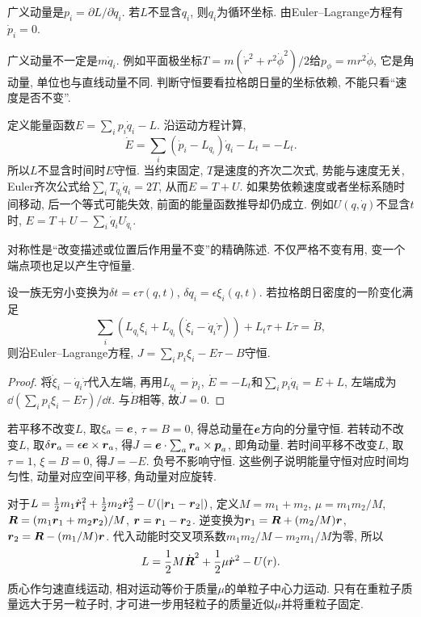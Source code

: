 \begin{definition}
广义动量是$p_i=\partial L/\partial\dot q_i$. 若$L$不显含$q_i$, 则$q_i$为循环坐标. 由Euler--Lagrange方程有$\dot p_i=0$.
\end{definition}
广义动量不一定是$m\dot q_i$. 例如平面极坐标$T=m(\dot r^2+r^2\dot\phi^2)/2$给$p_\phi=mr^2\dot\phi$, 它是角动量, 单位也与直线动量不同. 判断守恒要看拉格朗日量的坐标依赖, 不能只看“速度是否不变”.

定义能量函数$E=\sum_ip_i\dot q_i-L$. 沿运动方程计算,
\[
\dot E=\sum_i(\dot p_i-L_{q_i})\dot q_i-L_t=-L_t.
\]
所以$L$不显含时间时$E$守恒. 当约束固定, $T$是速度的齐次二次式, 势能与速度无关, Euler齐次公式给$\sum_iT_{\dot q_i}\dot q_i=2T$, 从而$E=T+U$. 如果势依赖速度或者坐标系随时间移动, 后一个等式可能失效, 前面的能量函数推导却仍成立. 例如$U(q,\dot q)$不显含$t$时, $E=T+U-\sum_i\dot q_iU_{\dot q_i}$.

对称性是“改变描述或位置后作用量不变”的精确陈述. 不仅严格不变有用, 变一个端点项也足以产生守恒量.
\begin{theorem}
设一族无穷小变换为$\delta t=\epsilon\tau(q,t)$, $\delta q_i=\epsilon\xi_i(q,t)$. 若拉格朗日密度的一阶变化满足
\[
\sum_i(L_{q_i}\xi_i+L_{\dot q_i}(\dot\xi_i-\dot q_i\dot\tau))+L_t\tau+L\dot\tau=\dot B,
\]
则沿Euler--Lagrange方程, $J=\sum_ip_i\xi_i-E\tau-B$守恒.
\end{theorem}
\begin{proof}
将$\dot\xi_i-\dot q_i\dot\tau$代入左端, 再用$L_{q_i}=\dot p_i$, $\dot E=-L_t$和$\sum_ip_i\dot q_i=E+L$, 左端成为
$\dd(\sum_ip_i\xi_i-E\tau)/\dd t$. 与$\dot B$相等, 故$\dot J=0$.
\end{proof}
若平移不改变$L$, 取$\xi_a=\boldsymbol{e}$, $\tau=B=0$, 得总动量在$\boldsymbol{e}$方向的分量守恒. 若转动不改变$L$, 取$\delta\boldsymbol{r}_a=\epsilon\boldsymbol{e}\times\boldsymbol{r}_a$, 得$J=\boldsymbol{e}\cdot\sum_a\boldsymbol{r}_a\times\boldsymbol{p}_a$, 即角动量. 若时间平移不改变$L$, 取$\tau=1$, $\xi=B=0$, 得$J=-E$. 负号不影响守恒. 这些例子说明能量守恒对应时间均匀性, 动量对应空间平移, 角动量对应旋转.

对于$L=\frac12m_1\dot{\boldsymbol{r}}_1^2+\frac12m_2\dot{\boldsymbol{r}}_2^2-U(|\boldsymbol{r}_1-\boldsymbol{r}_2|)$, 定义$M=m_1+m_2$, $\mu=m_1m_2/M$, $\boldsymbol{R}=(m_1\boldsymbol{r}_1+m_2\boldsymbol{r}_2)/M$, $\boldsymbol{r}=\boldsymbol{r}_1-\boldsymbol{r}_2$. 逆变换为$\boldsymbol{r}_1=\boldsymbol{R}+(m_2/M)\boldsymbol{r}$, $\boldsymbol{r}_2=\boldsymbol{R}-(m_1/M)\boldsymbol{r}$. 代入动能时交叉项系数$m_1m_2/M-m_2m_1/M$为零, 所以
\[
L=\frac12M\dot{\boldsymbol{R}}^2+\frac12\mu\dot{\boldsymbol{r}}^2-U(r).
\]
质心作匀速直线运动, 相对运动等价于质量$\mu$的单粒子中心力运动. 只有在重粒子质量远大于另一粒子时, 才可进一步用轻粒子的质量近似$\mu$并将重粒子固定.

